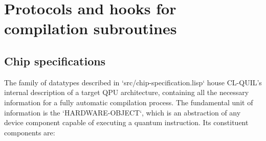 
\section{Protocols and hooks for compilation subroutines}

\subsection{Chip specifications}\label{ChipSpecifications}

The family of datatypes described in `src/chip-specification.lisp` house CL-QUIL's internal description of a target QPU architecture, containing all the necessary information for a fully automatic compilation process.  The fundamental unit of information is the `HARDWARE-OBJECT`, which is an abstraction of any device component capable of executing a quantum instruction.  Its constituent components are:

